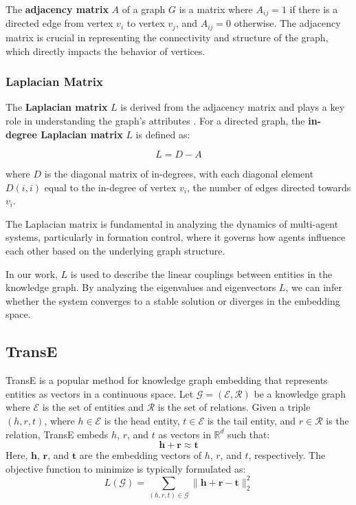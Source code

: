 \documentclass[letterpaper, 10 pt, conference]{ieeeconf}  %
\begin{document}
The \textbf{adjacency matrix} \( A \) of a graph \( G \) is a matrix where \( A_{ij} = 1 \) if there is a directed edge from vertex \( v_i \) to vertex \( v_j \), and \( A_{ij} = 0 \) otherwise. The adjacency matrix is crucial in representing the connectivity and structure of the graph, which directly impacts the behavior of vertices.

\subsubsection{Laplacian Matrix}

The \textbf{Laplacian matrix} \( L \) is derived from the adjacency matrix and plays a key role in understanding the graph's attributes \cite{mirzaev_laplacian_2013}. For a directed graph, the \textbf{in-degree Laplacian matrix} \( L \) is defined as:

\[
L = D - A
\]

\noindent where \( D \) is the diagonal matrix of in-degrees, with each diagonal element \( D(i, i) \) equal to the in-degree of vertex \( v_i \), the number of edges directed towards \( v_i \).

\noindent The Laplacian matrix is fundamental in analyzing the dynamics of multi-agent systems, particularly in formation control, where it governs how agents influence each other based on the underlying graph structure.

In our work, $L$ is used to describe the linear couplings between entities in the knowledge graph. By analyzing the eigenvalues and eigenvectors $L$, we can infer whether the system converges to a stable solution or diverges in the embedding space.

\subsection{TransE}
TransE \cite{bordes_translating_2013} is a popular method for knowledge graph embedding that represents entities as vectors in a continuous space. Let $\mathcal{G} = (\mathcal{E}, \mathcal{R})$ be a knowledge graph where $\mathcal{E}$ is the set of entities and $\mathcal{R}$ is the set of relations. Given a triple $(h, r, t)$, where $h \in \mathcal{E}$ is the head entity, $t \in \mathcal{E}$ is the tail entity, and $r \in \mathcal{R}$ is the relation, TransE embeds $h$, $r$, and $t$ as vectors in $\mathbb{R}^d$ such that:
\[
\mathbf{h} + \mathbf{r} \approx \mathbf{t}
\]
Here, $\mathbf{h}$, $\mathbf{r}$, and $\mathbf{t}$ are the embedding vectors of $h$, $r$, and $t$, respectively. The objective function to minimize is typically formulated as:
\[
L(\mathcal{G}) = \sum_{(h,r,t) \in \mathcal{G}} \|\mathbf{h} + \mathbf{r} - \mathbf{t}\|_2^2
\]
\end{document}
